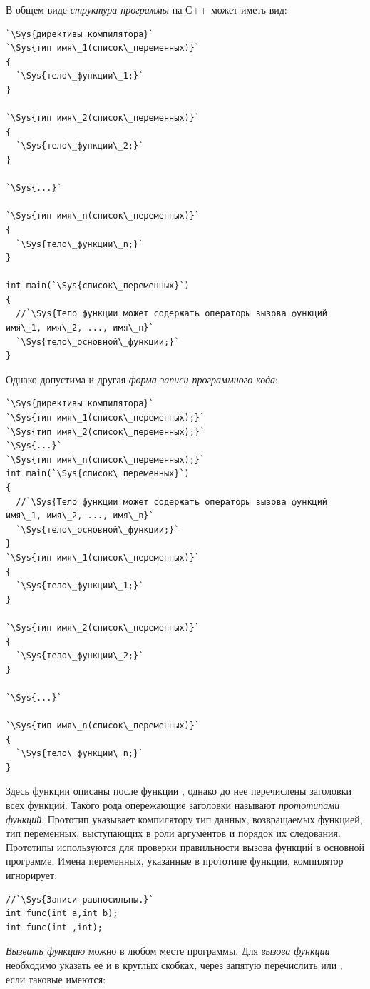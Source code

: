 В общем виде \emph{структура программы} на С++ может иметь вид:
\begin{lstlisting}
`\Sys{директивы компилятора}`
`\Sys{тип имя\_1(список\_переменных)}`
{
  `\Sys{тело\_функции\_1;}`
}

`\Sys{тип имя\_2(список\_переменных)}`
{
  `\Sys{тело\_функции\_2;}`
}

`\Sys{...}`

`\Sys{тип имя\_n(список\_переменных)}`
{
  `\Sys{тело\_функции\_n;}`
}

int main(`\Sys{список\_переменных}`)
{
  //`\Sys{Тело функции может содержать операторы вызова функций имя\_1, имя\_2, ..., имя\_n}`
  `\Sys{тело\_основной\_функции;}`
}
\end{lstlisting}
Однако допустима и другая \emph{форма записи программного кода}:

\begin{lstlisting}
`\Sys{директивы компилятора}`
`\Sys{тип имя\_1(список\_переменных);}`
`\Sys{тип имя\_2(список\_переменных);}`
`\Sys{...}`
`\Sys{тип имя\_n(список\_переменных);}`
int main(`\Sys{список\_переменных}`)
{
  //`\Sys{Тело функции может содержать операторы вызова функций имя\_1, имя\_2, ..., имя\_n}`
  `\Sys{тело\_основной\_функции;}`
}
`\Sys{тип имя\_1(список\_переменных)}`
{
  `\Sys{тело\_функции\_1;}`
}

`\Sys{тип имя\_2(список\_переменных)}`
{
  `\Sys{тело\_функции\_2;}`
}

`\Sys{...}`

`\Sys{тип имя\_n(список\_переменных)}`
{
  `\Sys{тело\_функции\_n;}`
}
\end{lstlisting}

Здесь функции описаны после функции , однако до нее перечислены заголовки всех функций. Такого
рода опережающие заголовки называют \emph{прототипами
функций}. Прототип указывает компилятору тип данных, возвращаемых функцией, тип переменных,
выступающих в роли аргументов и порядок их следования. Прототипы используются для проверки правильности вызова функций
в основной программе. Имена переменных, указанные в прототипе функции, компилятор игнорирует:
\begin{lstlisting}
//`\Sys{Записи равносильны.}`
int func(int a,int b);
int func(int ,int);
\end{lstlisting}
\emph{Вызвать функцию} можно в любом месте программы. Для \emph{вызова
функции} необходимо указать ее  и в круглых скобках, через запятую перечислить
 или , если таковые имеются:

